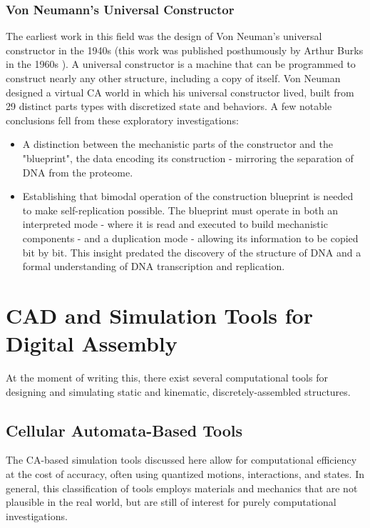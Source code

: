 {\subsubsection{Von Neumann's Universal Constructor}

The earliest work in this field was the design of Von Neuman's universal constructor in the 1940s (this work was published posthumously by Arthur Burks in the 1960s \cite{Burks1969}).  A universal constructor is a machine that can be programmed to construct nearly any other structure, including a copy of itself.  Von Neuman designed a virtual CA world in which his universal constructor lived, built from 29 distinct parts types with discretized state and behaviors.  A few notable conclusions fell from these exploratory investigations:\\

\begin{itemize}
\item{A distinction between the mechanistic parts of the constructor and the "blueprint", the data encoding its construction - mirroring the separation of DNA from the proteome.}
\item{Establishing that bimodal operation of the construction blueprint is needed to make self-replication possible.  The blueprint must operate in both an interpreted mode - where it is read and executed to build mechanistic components - and a duplication mode - allowing its information to be copied bit by bit.  This insight predated the discovery of the structure of DNA and a formal understanding of DNA transcription and replication.}
\end{itemize}

\section{CAD and Simulation Tools for Digital Assembly}

At the moment of writing this, there exist several computational tools for designing and simulating static and kinematic, discretely-assembled structures.

\subsection{Cellular Automata-Based Tools}

The CA-based simulation tools discussed here allow for computational efficiency at the cost of accuracy, often using quantized motions, interactions, and states.  In general, this classification of tools employs materials and mechanics that are not plausible in the real world, but are still of interest for purely computational investigations.\\

}
